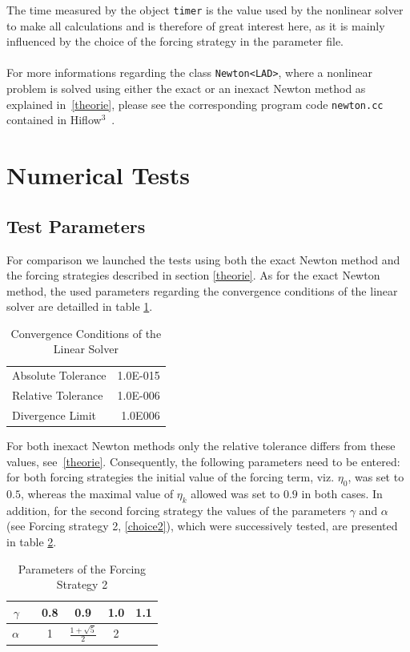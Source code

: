 \documentclass[a4paper, 11pt, twoside]{article}
\begin{document}
The time measured by the object \verb+timer+ is the value used by the nonlinear solver to make all calculations and is therefore of great interest here, as it is mainly influenced by the choice of the forcing strategy in the parameter file. \\ \\
For more informations regarding the class \verb+Newton<LAD>+, where a nonlinear problem is solved using either the exact or an inexact Newton method as explained in~\ref{theorie}, please see the corresponding program code \verb+newton.cc+ contained in Hiflow$^3$~\cite{hiflow3:nonlinear}.


\section{Numerical Tests} \label{results:1}
\subsection{Test Parameters}
For comparison we launched the tests using both the exact Newton method and the forcing strategies described in section \ref{theorie}. As for the exact Newton method, the used parameters regarding the convergence conditions of the linear solver are detailled in table \ref{CC}.

\begin{table}[h] 

\centering
\begin{tabular}{l|r}
Absolute Tolerance & 1.0E-015 \\
Relative Tolerance & 1.0E-006 \\
Divergence Limit & 1.0E006
\end{tabular} 

\caption{Convergence Conditions of the Linear Solver} \label{CC}

\end{table} 

For both inexact Newton methods only the relative tolerance differs from these values, see~\ref{theorie}. Consequently, the following parameters need to be entered: for both forcing strategies the initial value of the forcing term, viz. $\eta_0$, was set to $0.5$, whereas the maximal value of $\eta_k$ allowed was set to $0.9$ in both cases. In addition, for the second forcing strategy the values of the parameters $\gamma$ and $\alpha$ (see Forcing strategy 2, \ref{choice2}), which were successively tested, are presented in table \ref{FS2}.

\begin{table}[h] 

\centering
\begin{tabular}{rcc|c|c|c}
$\gamma$ && 0.8 & 0.9 & 1.0 & 1.1  \\
\hline \hline
$\alpha$ && 1 & $\frac{1+\sqrt{5}}{2}$ & 2
\end{tabular}

\caption{Parameters of the Forcing Strategy 2} \label{FS2}

\end{table}
\end{document}
